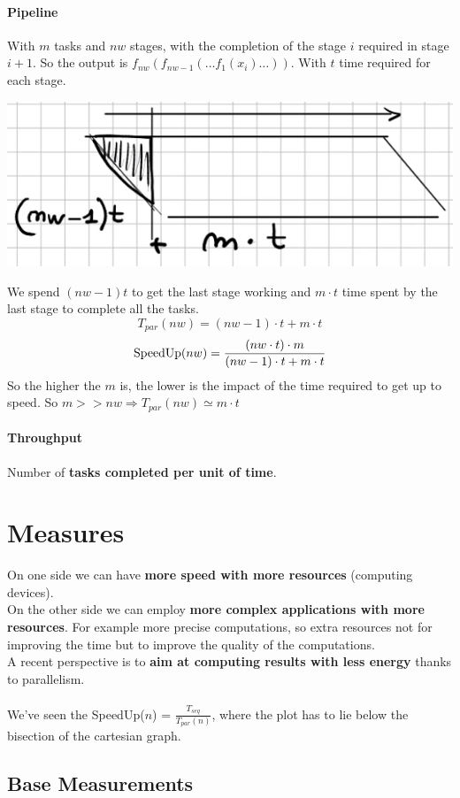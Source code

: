 \documentclass[10pt]{report}
\begin{document}
\paragraph{Pipeline} With $m$ tasks and $nw$ stages, with the completion of the stage $i$ required in stage $i+1$. So the output is $f_{nw}(f_{nw-1}(\ldots f_1(x_i)\ldots))$. With $t$ time required for each stage.
\begin{center}
	\includegraphics[scale=0.5]{2.png}
\end{center}
We spend $(nw-1)t$ to get the last stage working and $m\cdot t$ time spent by the last stage to complete all the tasks.
$$T_{par}(nw) = (nw-1)\cdot t + m\cdot t$$
$$\hbox{SpeedUp}(nw)=\frac{(nw\cdot t)\cdot m}{(nw-1)\cdot t + m\cdot t}$$
So the higher the $m$ is, the lower is the impact of the time required to get up to speed. So $m >> nw \Rightarrow T_{par}(nw) \simeq m\cdot t$
\paragraph{Throughput} Number of \textbf{tasks completed per unit of time}.
\section{Measures}
On one side we can have \textbf{more speed with more resources} (computing devices).\\
On the other side we can employ \textbf{more complex applications with more resources}. For example more precise computations, so extra resources not for improving the time but to improve the quality of the computations.\\
A recent perspective is to \textbf{aim at computing results with less energy} thanks to parallelism.\\\\
We've seen the SpeedUp($n$) = $\frac{T_{seq}}{T_{par}(n)}$, where the plot has to lie below the bisection of the cartesian graph.
\subsection{Base Measurements}
\end{document}
